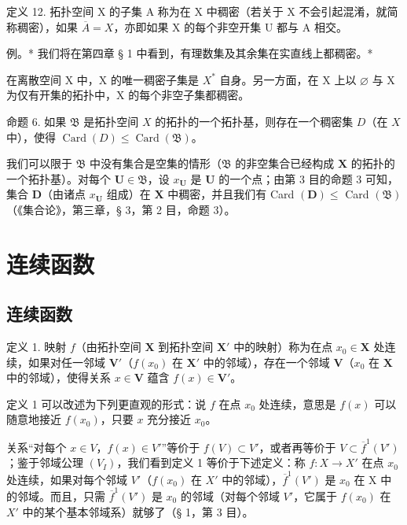 定义 12. 拓扑空间 X 的子集 A 称为在 X 中稠密（若关于 X 不会引起混淆，就简称稠密），如果 \(\overline{A} = X\)，亦即如果 X 的每个非空开集 U 都与 A 相交。

例。* 我们将在第四章 § 1 中看到，有理数集及其余集在实直线上都稠密。*

在离散空间 X 中，X 的唯一稠密子集是 \(X^{*}\) 自身。另一方面，在 X 上以 \(\varnothing\) 与 X 为仅有开集的拓扑中，X 的每个非空子集都稠密。

命题 6. 如果 \(\mathfrak{B}\) 是拓扑空间 \(X\) 的拓扑的一个拓扑基，则存在一个稠密集 \(D\)（在 \(X\) 中），使得 \(\operatorname{Card}(D) \leqslant \operatorname{Card}(\mathfrak{B})\)。

我们可以限于 \(\mathfrak{B}\) 中没有集合是空集的情形（\(\mathfrak{B}\) 的非空集合已经构成 \(\mathbf{X}\) 的拓扑的一个拓扑基）。对每个 \(\mathbf{U} \in \mathfrak{B}\)，设 \(x_{\mathbf{U}}\) 是 \(\mathbf{U}\) 的一个点；由第 3 目的命题 3 可知，集合 \(\mathbf{D}\)（由诸点 \(x_{\mathbf{U}}\) 组成）在 \(\mathbf{X}\) 中稠密，并且我们有 Card \((\mathbf{D}) \leqslant\) Card \((\mathfrak{B})\)（《集合论》，第三章，§ 3，第 2 目，命题 3）。

\section{连续函数}

\subsection{连续函数}

定义 1. 映射 \(f\)（由拓扑空间 \(\mathbf{X}\) 到拓扑空间 \(\mathbf{X}'\) 中的映射）称为在点 \(x_0 \in \mathbf{X}\) 处连续，如果对任一邻域 \(\mathbf{V}'\)（\(f(x_0)\) 在 \(\mathbf{X}'\) 中的邻域），存在一个邻域 \(\mathbf{V}\)（\(x_0\) 在 \(\mathbf{X}\) 中的邻域），使得关系 \(x \in \mathbf{V}\) 蕴含 \(f(x) \in \mathbf{V}'\)。

定义 1 可以改述为下列更直观的形式：说 \(f\) 在点 \(x_0\) 处连续，意思是 \(f(x)\) 可以随意地接近 \(f(x_0)\)，只要 \(x\) 充分接近 \(x_0\)。

关系“对每个 \(x \in V\)，\(f(x) \in V'\)”等价于 \(f(V) \subset V'\)，或者再等价于 \(V \subset \overline{f}^{1}(V')\)；鉴于邻域公理 \((V_{I})\)，我们看到定义 1 等价于下述定义：称 \(f: X \to X'\) 在点 \(x_{0}\) 处连续，如果对每个邻域 \(V'\)（\(f(x_{0})\) 在 \(X'\) 中的邻域），\(\overline{f}^{1}(V')\) 是 \(x_{0}\) 在 X 中的邻域。而且，只需 \(\overline{f}^{1}(V')\) 是 \(x_{0}\) 的邻域（对每个邻域 \(V'\)，它属于 \(f(x_{0})\) 在 \(X'\) 中的某个基本邻域系）就够了（§ 1，第 3 目）。

